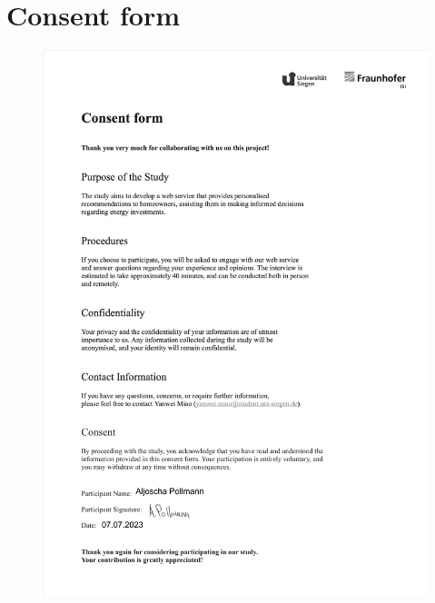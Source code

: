 \clearpage %

\chapter{Consent form}
\label{appendix:consentform}

\begin{figure}[h]
    \centering
    \includegraphics[width=\textwidth]{Images/consent_b.jpg}
\end{figure}

